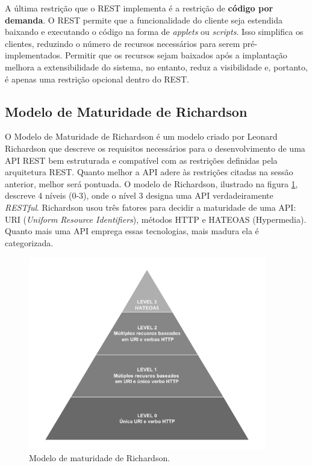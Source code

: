 A última restrição que o REST implementa é a restrição de \textbf{código por demanda}. O REST permite que a funcionalidade do cliente seja estendida baixando e executando o código na forma de \textit{applets} ou \textit{scripts}. Isso simplifica os clientes, reduzindo o número de recursos necessários para serem pré-implementados. Permitir que os recursos sejam baixados após a implantação melhora a extensibilidade do sistema, no entanto, reduz a visibilidade e, portanto, é apenas uma restrição opcional dentro do REST.

\subsection{Modelo de Maturidade de Richardson}

O Modelo de Maturidade de Richardson é um modelo criado por Leonard Richardson que descreve os requisitos necessários para o desenvolvimento de uma API REST bem estruturada e compatível com as restrições definidas pela arquitetura REST. Quanto melhor a API adere às restrições citadas na sessão anterior, melhor será pontuada. O modelo de Richardson, ilustrado na figura \ref{fig:rest-maturity-model}, descreve 4 níveis (0-3), onde o nível 3 designa uma API verdadeiramente \textit{RESTful}. Richardson usou três fatores para decidir a maturidade de uma API: URI (\textit{Uniform Resource Identifiers}), métodos HTTP e HATEOAS (Hypermedia). Quanto mais uma API emprega essas tecnologias, mais madura ela é categorizada.

\begin{figure}[htbp]
\centering
\includegraphics[width=0.93\textwidth]{figuras/modelo-maturidade.png}
\caption{Modelo de maturidade de Richardson.}
\label{fig:rest-maturity-model}
\end{figure}


